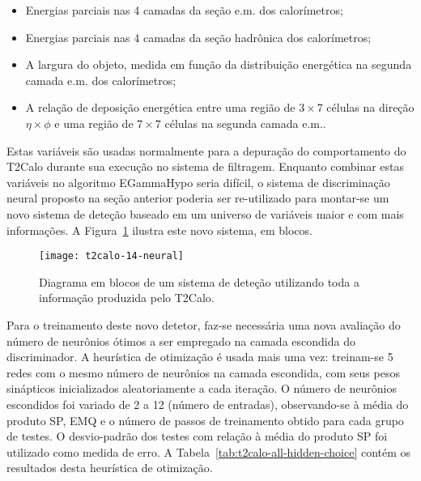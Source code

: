 \begin{itemize}
\item Energias parciais nas 4 camadas da seção e.m. dos calorímetros;
\item Energias parciais nas 4 camadas da seção hadrônica dos calorímetros;
\item A largura do objeto, medida em função da distribuição energética na
segunda camada e.m. dos calorímetros;
\item A relação de deposição energética entre uma região de $3\times7$ células
na direção $\eta\times\phi$ e uma região de $7\times7$ células na segunda
camada e.m..
\end{itemize}

Estas variáveis são usadas normalmente  para a depuração do
comportamento do T2Calo durante sua execução no sistema de filtragem. Enquanto
combinar estas variáveis no algoritmo EGammaHypo seria difícil, o sistema de
discriminação neural proposto na seção anterior poderia ser re-utilizado para
montar-se um novo sistema de deteção baseado em um universo de variáveis maior
e com mais informações. A Figura~\ref{fig:t2calo-14-neural} ilustra este novo
sistema, em blocos.

\begin{figure}
\begin{center}
\texttt{[image: t2calo-14-neural]}
\end{center}
\caption{Diagrama em blocos de um sistema de deteção utilizando toda a
informação produzida pelo T2Calo.}
\label{fig:t2calo-14-neural}
\end{figure}

Para o treinamento deste novo detetor, faz-se necessária uma nova avaliação do
número de neurônios ótimos a ser empregado na camada escondida do
discriminador. A heurística de otimização é usada mais uma vez: treinam-se 5
redes com o mesmo número de neurônios na camada escondida, com seus pesos
sinápticos inicializados aleatoriamente a cada iteração. O número de neurônios
escondidos foi variado de 2 a 12 (número de entradas), observando-se à média
do produto SP, EMQ e o número de passos de treinamento obtido para cada grupo
de testes. O desvio-padrão dos testes com relação à média do produto SP foi
utilizado como medida de erro. A Tabela~\ref{tab:t2calo-all-hidden-choice}
contém os resultados desta heurística de otimização.

